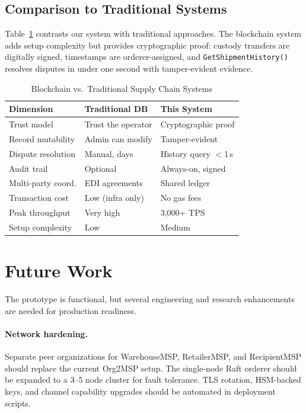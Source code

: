 \documentclass[conference]{IEEEtran}
\begin{document}
\subsection{Comparison to Traditional Systems}

Table~\ref{tab:comparison} contrasts our system with traditional approaches.
The blockchain system adds setup complexity but provides cryptographic proof:
custody transfers are digitally signed, timestamps are orderer-assigned, and
\texttt{GetShipmentHistory()} resolves disputes in under one second with
tamper-evident evidence.

\begin{table}[h]
\caption{Blockchain vs.\ Traditional Supply Chain Systems}
\label{tab:comparison}
\centering
\renewcommand{\arraystretch}{1.1}
\begin{tabular}{@{}lll@{}}
\toprule
\textbf{Dimension} & \textbf{Traditional DB} & \textbf{This System} \\
\midrule
Trust model         & Trust the operator  & Cryptographic proof \\
Record mutability   & Admin can modify    & Tamper-evident \\
Dispute resolution  & Manual, days        & History query $<$1\,s \\
Audit trail         & Optional            & Always-on, signed \\
Multi-party coord.  & EDI agreements      & Shared ledger \\
Transaction cost    & Low (infra only)    & No gas fees \\
Peak throughput     & Very high           & 3{,}000+ TPS \\
Setup complexity    & Low                 & Medium \\
\bottomrule
\end{tabular}
\end{table}

\section{Future Work}

The prototype is functional, but several engineering and research enhancements are needed for production readiness.

\paragraph{Network hardening.}
Separate peer organizations for WarehouseMSP, RetailerMSP, and RecipientMSP should replace the current Org2MSP setup. The single-node Raft orderer should be expanded to a 3–5 node cluster for fault tolerance. TLS rotation, HSM-backed keys, and channel capability upgrades should be automated in deployment scripts.
\end{document}
